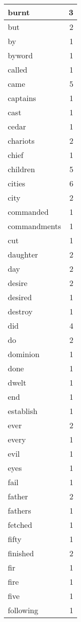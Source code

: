 \begin{center}
\begin{longtable}{l|r}
burnt & 3 \\ \hline
but & 2 \\ \hline
by & 1 \\ \hline
byword & 1 \\ \hline
called & 1 \\ \hline
came & 5 \\ \hline
captains & 1 \\ \hline
cast & 1 \\ \hline
cedar & 1 \\ \hline
chariots & 2 \\ \hline
chief & 1 \\ \hline
children & 5 \\ \hline
cities & 6 \\ \hline
city & 2 \\ \hline
commanded & 1 \\ \hline
commandments & 1 \\ \hline
cut & 1 \\ \hline
daughter & 2 \\ \hline
day & 2 \\ \hline
desire & 2 \\ \hline
desired & 1 \\ \hline
destroy & 1 \\ \hline
did & 4 \\ \hline
do & 2 \\ \hline
dominion & 1 \\ \hline
done & 1 \\ \hline
dwelt & 1 \\ \hline
end & 1 \\ \hline
establish & 1 \\ \hline
ever & 2 \\ \hline
every & 1 \\ \hline
evil & 1 \\ \hline
eyes & 1 \\ \hline
fail & 1 \\ \hline
father & 2 \\ \hline
fathers & 1 \\ \hline
fetched & 1 \\ \hline
fifty & 1 \\ \hline
finished & 2 \\ \hline
fir & 1 \\ \hline
fire & 1 \\ \hline
five & 1 \\ \hline
following & 1 \\ \hline

\end{longtable}
\end{center}
